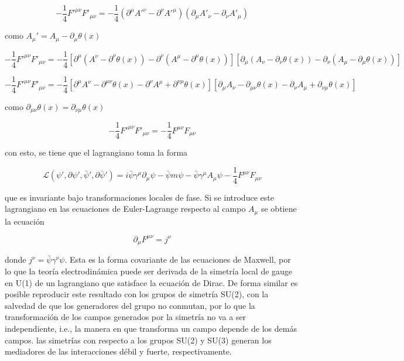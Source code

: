 $$ -\frac{1}{4}F'^{\mu\nu}F'_{\mu\nu} = -\frac{1}{4}(\partial^{\mu}A'^{\nu} - \partial^{\nu}A'^{\mu})(\partial_{\mu}A'_{\nu} - \partial_{\nu}A'_{\mu}) $$

como $A_{\mu}' = A_{\mu} - \partial_{\mu}\theta(x)$ 

$$ -\frac{1}{4}F'^{\mu\nu}F'_{\mu\nu} = -\frac{1}{4}[\partial^{\mu}(A^{\nu} - \partial^{\nu}\theta(x)) - \partial^{\nu}(A^{\mu} - \partial^{\mu}\theta(x))][\partial_{\mu}(A_{\nu} - \partial_{\nu}\theta(x)) - \partial_{\nu}(A_{\mu} - \partial_{\mu}\theta(x))] $$

$$ -\frac{1}{4}F'^{\mu\nu}F'_{\mu\nu} = -\frac{1}{4}[\partial^{\mu}A^{\nu} - \partial^{\mu\nu}\theta(x) - \partial^{\nu}A^{\mu} + \partial^{\nu\mu}\theta(x)][\partial_{\mu}A_{\nu} - \partial_{\mu\nu}\theta(x) - \partial_{\nu}A_{\mu} + \partial_{\nu\mu}\theta(x)] $$

como $\partial_{\mu\nu}\theta(x) = \partial_{\nu\mu}\theta(x)$

$$ -\frac{1}{4}F'^{\mu\nu}F'_{\mu\nu} = -\frac{1}{4}F^{\mu\nu}F_{\mu\nu} $$

con esto, se tiene que el lagrangiano toma la forma

\begin{equation}
    \mathcal{L}(\psi', \partial \psi', \bar{\psi}', \partial\bar{\psi}') =  i\bar{\psi}\gamma^{\mu}\partial_{\mu}\psi - \bar{\psi}m\psi - \bar{\psi}\gamma^{\mu}A_{\mu}\psi -\frac{1}{4}F^{\mu\nu}F_{\mu\nu}
\end{equation}

que es invariante bajo transformaciones locales de fase. Si se introduce este lagrangiano en las ecuaciones de Euler-Lagrange respecto al campo $A_{\mu}$ se obtiene la ecuación

\begin{equation}
    \partial_{\mu}F^{\mu\nu}  = j^{\nu}
\end{equation}

donde $j^{\nu} = \bar{\psi}\gamma^{\nu}\psi$. Esta es la forma covariante de las ecuaciones de Maxwell, por lo que la teoría electrodinámica puede ser derivada de la simetría local de gauge en U(1) de un lagrangiano que satisface la ecuación de Dirac. De forma similar es posible reproducir este resultado con los grupos de simetría SU(2), con la salvedad de que los generadores del grupo no conmutan, por lo que la transformación de los campos generados por la simetría no va a ser independiente, i.e., la manera en que transforma un campo depende de los demás campos. las simetrías con respecto a los grupos SU(2) y SU(3) generan los mediadores de las interacciones débil y fuerte, respectivamente.

